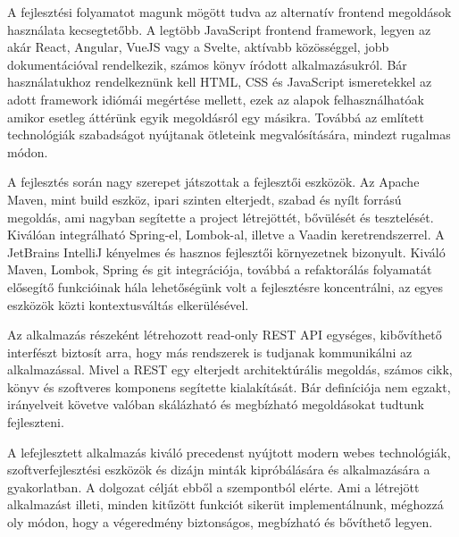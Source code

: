 A fejlesztési folyamatot magunk mögött tudva az alternatív frontend megoldások használata kecsegtetőbb. A legtöbb JavaScript frontend framework, legyen az akár React, Angular, VueJS vagy a Svelte, aktívabb közösséggel, jobb dokumentációval rendelkezik, számos könyv íródott alkalmazásukról. Bár használatukhoz rendelkeznünk kell HTML, CSS és JavaScript ismeretekkel az adott framework idiómái megértése mellett, ezek az alapok felhasználhatóak amikor esetleg áttérünk egyik megoldásról egy másikra. Továbbá az említett technológiák szabadságot nyújtanak ötleteink megvalósítására, mindezt rugalmas módon. \par

A fejlesztés során nagy szerepet játszottak a fejlesztői eszközök. Az Apache Maven, mint build eszköz, ipari szinten elterjedt, szabad és nyílt forrású megoldás, ami nagyban segítette a project létrejöttét, bővülését és tesztelését. Kiválóan integrálható Spring-el, Lombok-al, illetve a Vaadin keretrendszerrel. A JetBrains IntelliJ kényelmes és hasznos fejlesztői környezetnek bizonyult. Kiváló Maven, Lombok, Spring és git integrációja, továbbá a refaktorálás folyamatát elősegítő funkcióinak hála lehetőségünk volt a fejlesztésre koncentrálni, az egyes eszközök közti kontextusváltás elkerülésével. \par

Az alkalmazás részeként létrehozott read-only REST API egységes, kibővíthető interfészt biztosít arra, hogy más rendszerek is tudjanak kommunikálni az alkalmazással. Mivel a REST egy elterjedt architektúrális megoldás, számos cikk, könyv és szoftveres komponens segítette kialakítását. Bár definíciója nem egzakt, irányelveit követve valóban skálázható és megbízható megoldásokat tudtunk fejleszteni. \par

A lefejlesztett alkalmazás kiváló precedenst nyújtott modern webes technológiák, szoftverfejlesztési eszközök és dizájn minták kipróbálására és alkalmazására a gyakorlatban. A dolgozat célját ebből a szempontból elérte. Ami a létrejött alkalmazást illeti, minden kitűzött funkciót sikerüt implementálnunk, méghozzá oly módon, hogy a végeredmény biztonságos, megbízható és bővíthető legyen.